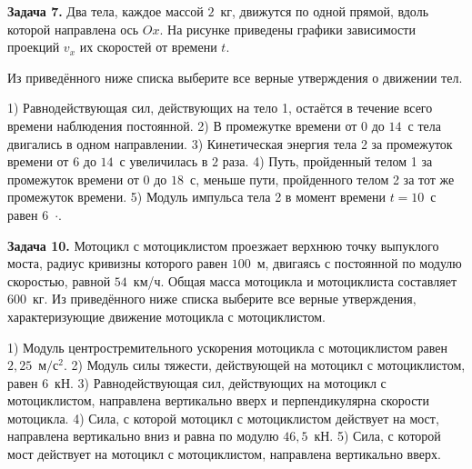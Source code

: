 \begin{taskbasic}[code={\label{task:newton2_v6_n5}}]
\textbf{Задача 7.} Два тела, каждое массой $2$~кг, движутся по одной прямой, вдоль которой направлена ось $Ox$. На рисунке приведены графики зависимости проекций $v_x$ их скоростей от времени $t$.
\begin{center}
\end{center}
Из приведённого ниже списка выберите все верные утверждения о движении тел.

1) Равнодействующая сил, действующих на тело 1, остаётся в течение всего времени наблюдения постоянной.
2) В промежутке времени от $0$ до $14$~с тела двигались в одном направлении.
3) Кинетическая энергия тела 2 за промежуток времени от $6$ до $14$~с увеличилась в $2$ раза.
4) Путь, пройденный телом 1 за промежуток времени от $0$ до $18$~с, меньше пути, пройденного телом 2 за тот же промежуток времени.
5) Модуль импульса тела 2 в момент времени $t=10$~с равен $6$~$\cdot$.

\end{taskbasic}



\begin{taskbasic}[code={\label{task:newton2_v9_n5}}]
\textbf{Задача 10.} Мотоцикл с мотоциклистом проезжает верхнюю точку выпуклого моста, радиус кривизны которого равен $100$~м, двигаясь с постоянной по модулю скоростью, равной $54$~км/ч. Общая масса мотоцикла и мотоциклиста составляет $600$~кг. Из приведённого ниже списка выберите все верные утверждения, характеризующие движение мотоцикла с мотоциклистом.

1) Модуль центростремительного ускорения мотоцикла с мотоциклистом равен $2{,}25$~$м/с^2$.
2) Модуль силы тяжести, действующей на мотоцикл с мотоциклистом, равен $6$~кН.
3) Равнодействующая сил, действующих на мотоцикл с мотоциклистом, направлена вертикально вверх и перпендикулярна скорости мотоцикла.
4) Сила, с которой мотоцикл с мотоциклистом действует на мост, направлена вертикально вниз и равна по модулю $46{,}5$~кН.
5) Сила, с которой мост действует на мотоцикл с мотоциклистом, направлена вертикально вверх.

\end{taskbasic}

